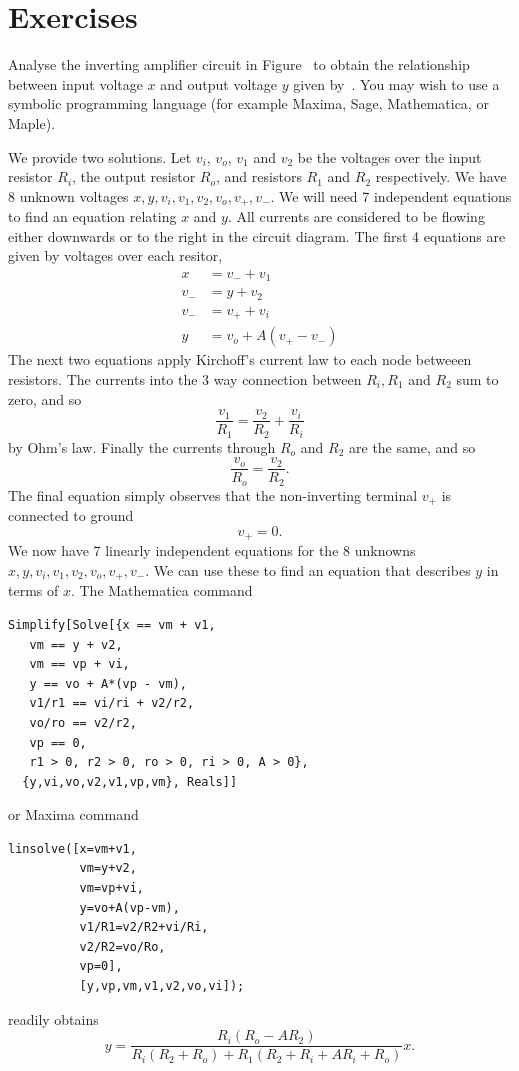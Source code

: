 
\section*{Exercises}

\begin{excersizelist}

\item \label{exer:multiplieropampwithmodel}  Analyse the inverting amplifier circuit in Figure~ to obtain the relationship between input voltage $x$ and output voltage $y$ given by~.  You may wish to use a symbolic programming language (for example Maxima, Sage, Mathematica, or Maple).
\begin{solution}
We provide two solutions.  Let $v_i$, $v_o$, $v_1$ and $v_2$ be the voltages over the input resistor $R_i$, the output resistor $R_o$, and resistors $R_1$ and $R_2$ respectively.  We have 8 unknown voltages $x,y,v_i,v_1,v_2,v_o,v_+,v_-$.  We will need 7 independent equations to find an equation relating $x$ and $y$.  All currents are considered to be flowing either downwards or to the right in the circuit diagram.  The first 4 equations are given by voltages over each resitor,
\begin{align*}
x &= v_- + v_1 \\
v_- &= y + v_2 \\
v_- &= v_+ + v_i \\
y &= v_o + A(v_+ - v_-) 
\end{align*}
The next two equations apply Kirchoff's current law to each node betweeen resistors.  The currents into the 3 way connection between $R_i, R_1$ and $R_2$ sum to zero, and so
\[
\frac{v_1}{R_1} = \frac{v_2}{R_2} + \frac{v_i}{R_i}
\]
by Ohm's law.  Finally the currents through $R_o$ and $R_2$ are the same, and so
\[
\frac{v_o}{R_o} = \frac{v_2}{R_2}.
\]
The final equation simply observes that the non-inverting terminal $v_+$ is connected to ground
\[
v_+ = 0.
\]
We now have 7 linearly independent equations for the 8 unknowns $x,y,v_i,v_1,v_2,v_o,v_+,v_-$.  We can use these to find an equation that describes $y$ in terms of $x$.  The Mathematica command
\begin{verbatim}
Simplify[Solve[{x == vm + v1,
   vm == y + v2,
   vm == vp + vi,
   y == vo + A*(vp - vm),
   v1/r1 == vi/ri + v2/r2,
   vo/ro == v2/r2,
   vp == 0,
   r1 > 0, r2 > 0, ro > 0, ri > 0, A > 0},
  {y,vi,vo,v2,v1,vp,vm}, Reals]]
\end{verbatim}
or Maxima command
\begin{verbatim}
linsolve([x=vm+v1,
          vm=y+v2,
          vm=vp+vi,
          y=vo+A(vp-vm),
          v1/R1=v2/R2+vi/Ri,
          v2/R2=vo/Ro,
          vp=0],
          [y,vp,vm,v1,v2,vo,vi]);
\end{verbatim}
readily obtains
\[
y = \frac{R_i (R_o - A R_2) }{R_i (R_2+R_o)+R_1 (R_2+R_i + A R_i+R_o)}x.
\]


\end{solution}
\end{excersizelist}
